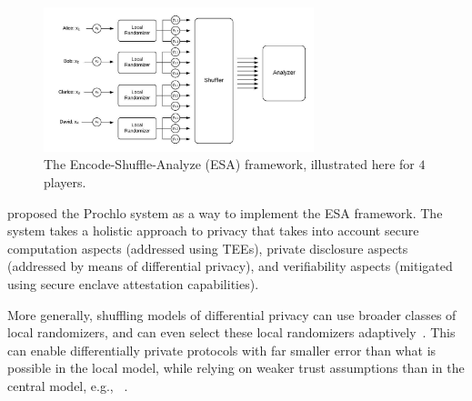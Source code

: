 \documentclass[11pt]{article}
\begin{document}
\begin{figure}[tb]
\centering
\includegraphics[width=0.7\textwidth]{esa_diagram.jpeg}
\caption{The Encode-Shuffle-Analyze (ESA) framework, illustrated here for $4$ players.}
\label{fig:esa}
\end{figure}

\citet{prochlo} proposed the Prochlo system as a way to implement the ESA framework. The system takes a holistic approach to privacy that takes into account secure computation aspects (addressed using TEEs), private disclosure aspects (addressed by means of differential privacy), and verifiability aspects (mitigated using secure enclave attestation capabilities). 

More generally, shuffling models of differential privacy can use broader classes of local randomizers, and can even select these local randomizers adaptively~\cite{erlingsson2019amplification}. This can enable differentially private protocols with far smaller error than what is possible in the local model, while relying on weaker trust assumptions than in the central model, e.g., ~\cite{cheu2019distributed, erlingsson2019amplification,BalleBGN19, ghazi2019scalable_1, ghazi2019scalable, ghazi2019private, pure-dp-shuffled, counting_shuffle_ICML, chen2020distributed}. 

\end{document}
